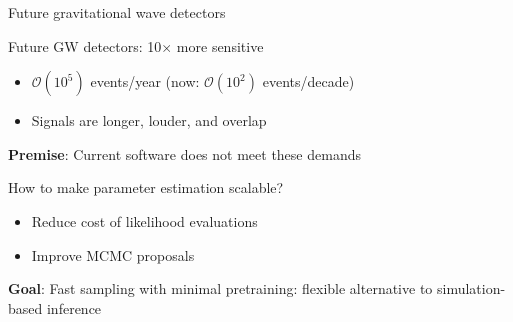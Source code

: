 \documentclass[usenames,dvipsnames,t]{beamer}
\begin{document}
\begin{frame}{Future gravitational wave detectors}
  \def\x{5mm}
  \def\y{1mm}

  Future GW detectors: 10$\times$ more sensitive
  \begin{itemize}
    \item $\mathcal{O}(10^5)$ events/year (now: $\mathcal{O}(10^2)$ events/decade)

    \vspace{\y}
    
    \item Signals are longer, louder, and overlap
  \end{itemize}

  \pause

  \begin{tcolorbox}[colback=blue!10, boxrule=0pt]
    \textbf{Premise}: Current software does not meet these demands~\cite{Hu:2024mvn}
  \end{tcolorbox}

  \pause
  \vspace{\x}

  How to make parameter estimation scalable?
  \begin{itemize}
    \item Reduce cost of likelihood evaluations

    \vspace{\y}

    \item Improve MCMC proposals
  \end{itemize}

  \pause
  \begin{tcolorbox}[colback=blue!10, boxrule=0pt]
    \textbf{Goal}: Fast sampling with minimal pretraining: flexible alternative to simulation-based inference~\cite{Langendorff:2022fzq, Bhardwaj:2023xph, Dax:2024mcn, Hu:2024oen, Santoliquido:2025lot}
  \end{tcolorbox}
  \vspace{\y}
  
  


\end{frame}
\end{document}
